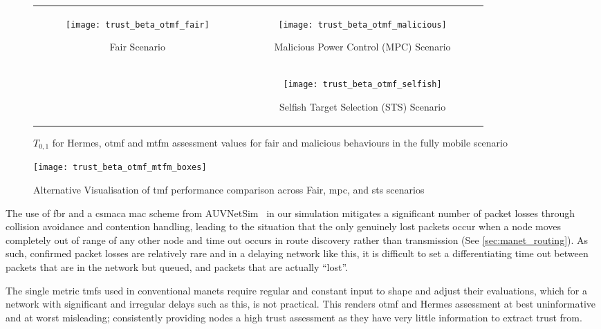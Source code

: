 \begin{figure*}[t]
	\centering
	\begin{tabular}{cc}
		\multirow{2}{*}{
			\begin{subfigure}{0.45\textwidth}	
				\texttt{[image: trust\_beta\_otmf\_fair]}
				\caption{Fair Scenario}
				\label{fig:all_mobile_fair_beta}
			\end{subfigure}
		}&
		\begin{subfigure}{0.45\textwidth}
			\texttt{[image: trust\_beta\_otmf\_malicious]} 
			\caption{Malicious Power Control (MPC) Scenario}
			\label{fig:all_mobile_badmouthing_beta}
		\end{subfigure} \\
		&
		\begin{subfigure}{0.45\textwidth}	
			\texttt{[image: trust\_beta\_otmf\_selfish]} 
			\caption{Selfish Target Selection (STS) Scenario}
			\label{fig:all_mobile_selfish_beta}
		\end{subfigure}
	\end{tabular}
	\caption{$T_{0,1}$ for Hermes, \gls{otmf} and \gls{mtfm} assessment values for fair and malicious behaviours in the fully mobile scenario}
	\label{fig:otmf_beta_comparison}
\end{figure*}
%
\begin{figure}
	\centering
	\texttt{[image: trust\_beta\_otmf\_mtfm\_boxes]}
	\caption{Alternative Visualisation of \gls{tmf} performance comparison across Fair, \gls{mpc}, and \gls{sts} scenarios}
	\label{fig:otmf_beta_comparison_boxes}
\end{figure}
The use of \gls{fbr} and a \gls{csmaca} \gls{mac} scheme from AUVNetSim~\cite{Miquel2008} in our simulation mitigates a significant number of packet losses through collision avoidance and contention handling, leading to the situation that the only genuinely lost packets occur when a node moves completely out of range of any other node and time out occurs in route discovery rather than transmission (See \autoref{sec:manet_routing}).
As such, confirmed packet losses are relatively rare and in a delaying network like this, it is difficult to set a differentiating time out between packets that are in the network but queued, and packets that are actually ``lost''.

The single metric \glspl{tmf} used in conventional \gls{manet}s require regular and constant input to shape and adjust their evaluations, which for a network with significant and irregular delays such as this, is not practical.
This renders \gls{otmf} and Hermes assessment at best uninformative and at worst misleading; consistently providing nodes a high trust assessment as they have very little information to extract trust from. 

